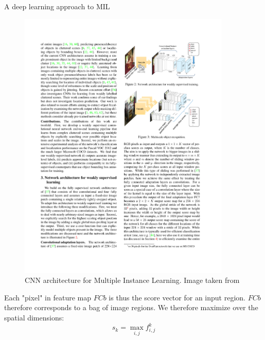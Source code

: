 \documentclass[xcolor=pdftex,dvipsnames,table]{beamer}
\begin{document}
\begin{frame}[noframenumbering]{A deep learning approach to MIL}
\begin{figure}[htb]
   \centering
   \includegraphics[width=0.9\textwidth]{../graphics/mil_deep_learning_v1.pdf}
   \caption{CNN architecture for Multiple Instance Learning. Image taken from \cite{Oquab2015}}
\end{figure}
Each "pixel" in feature map $FCb$ is thus the score vector for an input region. $FCb$ therefore corresponds to a bag of image regions. We therefore maximize over the spatial dimensions:
\begin{equation}
   s_k = \max_{i,j}f_{i,j}^k
\end{equation}
\end{frame}
\end{document}
